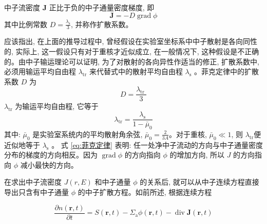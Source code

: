 \documentclass{Sichuan Normal University}
\begin{document}
\begin{theorem}[菲克定律]
    中子流密度 $\boldsymbol{J}$ 正比于负的中子通量密度梯度, 即
    \begin{equation}
    \boldsymbol{J}=-D \operatorname{grad} \phi
    \label{eq:菲克定律}
\end{equation}
    其中比例常数 $D=\frac{\lambda_{\mathrm{s}}}{3}$, 并称作扩散系数。
\end{theorem}

应该指出, 在上面的推导过程中, 曾经假设在实验室坐标系中中子散射是各向同性的, 实际上, 这一假设只有对于重核才近似成立, 在一般情况下, 这种假设是不正确的。由中子输运理论可以证明, 为了对散射的各向异性作适当的修正, 扩散系数中, 必须用输运平均自由程 $\lambda_{\mathrm{tr}}$ 来代替式中的散射平均自由程 $\lambda_{\mathrm{s}}$ 。菲克定律中的扩散系数 $D$ 为
\begin{equation}
    D=\frac{\lambda_{\text {tr }}}{3}
    \label{eq:扩散系数}
\end{equation}
    $\lambda_{\mathrm{tr}}$ 为输运平均自由程, 它等于
\begin{equation}
    \lambda_{\mathrm{tr}}=\frac{\lambda_{\mathrm{s}}}{1-\bar{\mu}_0}
    \label{eq:输运平均自由程}
\end{equation}
其中: $\bar{\mu}_0$ 是实验室系统内的平均散射角余弦\cite{XieZhongShengHeFanYingDuiWuLiFenXi2020}, $\bar{\mu}_0=\frac{2}{3 A}$。对于重核, $\bar{\mu}_0 \ll 1$, 则 $\lambda_{\mathrm{tr}}$便近似地等于 $\lambda_{\mathrm{s}}$ 。
式 \eqref{eq:菲克定律} 表明: 任一处净中子流动的方向与中子通量密度分布的梯度的方向相反。因为 $\operatorname{grad} \phi$ 的方向指向 $\phi$ 的增加方向, 所以 $J$ 的方向指向 $\phi$ 减小最快的方向。


在求出中子流密度 $J(r, E)$ 和中子通量 $\phi$ 的关系后, 就可以从中子连续方程直接导出只含有中子通量 $\phi$ 的中子扩散方程。如前所述, 根据连续方程

\begin{equation}
    \frac{\partial n(\boldsymbol{r}, t)}{\partial t}=S(\boldsymbol{r}, t)-\Sigma_{\mathrm{a}} \phi(\boldsymbol{r}, t)-\operatorname{div} \boldsymbol{J}(\boldsymbol{r}, t)
\end{equation}
\end{document}
